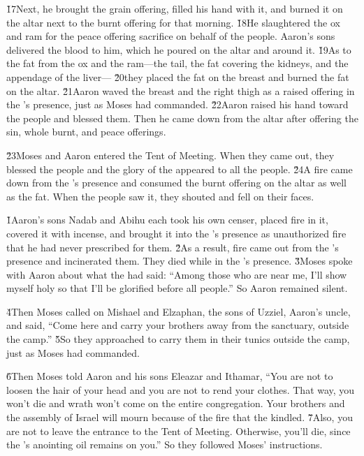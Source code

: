 \v{17}Next, he brought the grain offering, filled his hand with it, and burned it on the altar next to the burnt offering for that morning. \v{18}He slaughtered the ox and ram for the peace offering sacrifice on behalf of the people. Aaron's sons delivered the blood to him, which he poured on the altar and around it. \v{19}As to the fat from the ox and the ram---the tail, the fat covering the kidneys, and the appendage of the liver--- \v{20}they placed the fat on the breast and burned the fat on the altar. \v{21}Aaron waved the breast and the right thigh as a raised offering in the 's presence, just as Moses had commanded. \v{22}Aaron raised his hand toward the people and blessed them. Then he came down from the altar after offering the sin, whole burnt, and peace offerings.

\v{23}Moses and Aaron entered the Tent of Meeting. When they came out, they blessed the people and the glory of the  appeared to all the people. \v{24}A fire came down from the 's presence and consumed the burnt offering on the altar as well as the fat. When the people saw it, they shouted and fell on their faces.

\v{1}Aaron's sons Nadab and Abihu each took his own censer, placed fire in it, covered it with incense, and brought it into the 's presence as unauthorized fire that he had never prescribed for them. \v{2}As a result, fire came out from the 's presence and incinerated them. They died while in the 's presence. \v{3}Moses spoke with Aaron about what the  had said: ``Among those who are near me, I'll show myself holy so that I'll be glorified before all people.'' So Aaron remained silent.

\v{4}Then Moses called on Mishael and Elzaphan, the sons of Uzziel, Aaron's uncle, and said, ``Come here and carry your brothers away from the sanctuary, outside the camp.'' \v{5}So they approached to carry them in their tunics outside the camp, just as Moses had commanded.

\v{6}Then Moses told Aaron and his sons Eleazar and Ithamar, ``You are not to loosen the hair of your head and you are not to rend your clothes. That way, you won't die and wrath won't come on the entire congregation. Your brothers and the assembly of Israel will mourn because of the fire that the  kindled. \v{7}Also, you are not to leave the entrance to the Tent of Meeting. Otherwise, you'll die, since the 's anointing oil remains on you.'' So they followed Moses' instructions.

